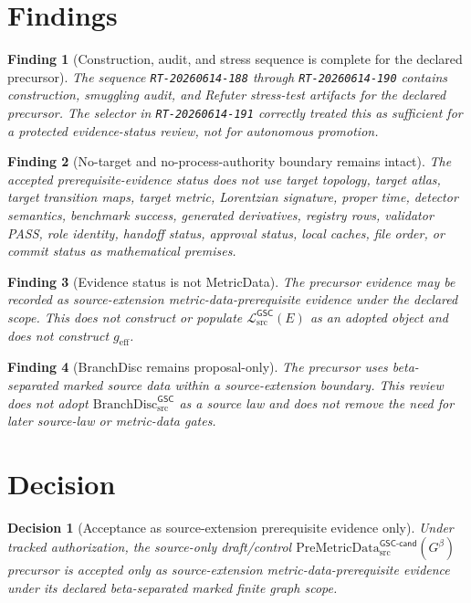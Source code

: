 \documentclass[11pt]{article}
\newcommand{\BranchDisc}{\mathrm{BranchDisc}_{\mathrm{src}}^{\mathsf{GSC}}}
\newcommand{\PreMetricData}{\mathrm{PreMetricData}_{\mathrm{src}}^{\mathsf{GSC\mbox{-}cand}}}
\newcommand{\Gbeta}{G^{\beta}}
\newcommand{\MetricData}{\mathcal{L}_{\mathrm{src}}^{\mathsf{GSC}}}
\newcommand{\geff}{g_{\mathrm{eff}}}
\newtheorem{decision}{Decision}
\newtheorem{finding}{Finding}
\begin{document}
\section{Findings}

\begin{finding}[Construction, audit, and stress sequence is complete for the declared precursor]
The sequence \texttt{RT-20260614-188} through \texttt{RT-20260614-190}
contains construction, smuggling audit, and Refuter stress-test artifacts for
the declared precursor. The selector in \texttt{RT-20260614-191} correctly
treated this as sufficient for a protected evidence-status review, not for
autonomous promotion.
\end{finding}

\begin{finding}[No-target and no-process-authority boundary remains intact]
The accepted prerequisite-evidence status does not use target topology, target
atlas, target transition maps, target metric, Lorentzian signature, proper
time, detector semantics, benchmark success, generated derivatives, registry
rows, validator PASS, role identity, handoff status, approval status, local
caches, file order, or commit status as mathematical premises.
\end{finding}

\begin{finding}[Evidence status is not MetricData]
The precursor evidence may be recorded as source-extension
metric-data-prerequisite evidence under the declared scope. This does not
construct or populate \(\MetricData(E)\) as an adopted object and does not
construct \(\geff\).
\end{finding}

\begin{finding}[BranchDisc remains proposal-only]
The precursor uses beta-separated marked source data within a source-extension
boundary. This review does not adopt \(\BranchDisc\) as a source law and does
not remove the need for later source-law or metric-data gates.
\end{finding}

\section{Decision}

\begin{decision}[Acceptance as source-extension prerequisite evidence only]
Under tracked authorization, the source-only draft/control
\(\PreMetricData(\Gbeta)\) precursor is accepted only as source-extension
metric-data-prerequisite evidence under its declared beta-separated marked
finite graph scope.
\end{decision}
\end{document}
